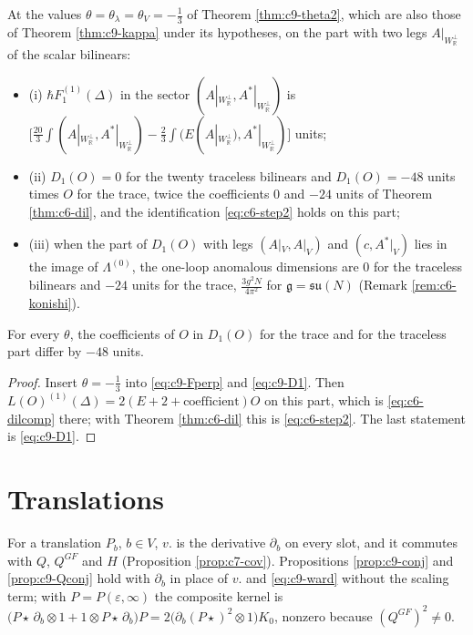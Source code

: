 \begin{corollary}
\label{cor:c9-ident}
At the values $\theta=\theta_\lambda=\theta_V=-\tfrac13$ of Theorem \ref{thm:c9-theta2}, which are also those of Theorem \ref{thm:c9-kappa} under its hypotheses, on the part with two legs $A|_{W_{\mathbb R}^\perp}$ of the scalar bilinears:
\begin{itemize}
\item (i) $\hbar F_1^{(1)}(\Delta)$ in the sector $(A|_{W_{\mathbb R}^\perp},A^*|_{W_{\mathbb R}^\perp})$ is $\big[\tfrac{20}3\int(A|_{W_{\mathbb R}^\perp},A^*|_{W_{\mathbb R}^\perp})-\tfrac23\int(E(A|_{W_{\mathbb R}^\perp}),A^*|_{W_{\mathbb R}^\perp})\big]$ units;
\item (ii) $D_1(O)=0$ for the twenty traceless bilinears and $D_1(O)=-48$ units times $O$ for the trace, twice the coefficients $0$ and $-24$ units of Theorem \ref{thm:c6-dil}, and the identification \eqref{eq:c6-step2} holds on this part;
\item (iii) when the part of $D_1(O)$ with legs $(A|_V,A|_V)$ and $(c,A^*|_V)$ lies in the image of $\Lambda^{(0)}$, the one-loop anomalous dimensions are $0$ for the traceless bilinears and $-24$ units for the trace, $\tfrac{3g^2N}{4\pi^2}$ for $\mathfrak g=\mathfrak{su}(N)$ (Remark \ref{rem:c6-konishi}).
\end{itemize}
For every $\theta$, the coefficients of $O$ in $D_1(O)$ for the trace and for the traceless part differ by $-48$ units.
\end{corollary}

\begin{proof}
Insert $\theta=-\tfrac13$ into \eqref{eq:c9-Fperp} and \eqref{eq:c9-D1}. Then $L(O)^{(1)}(\Delta)=2(E+2+\text{coefficient})O$ on this part, which is \eqref{eq:c6-dilcomp} there; with Theorem \ref{thm:c6-dil} this is \eqref{eq:c6-step2}. The last statement is \eqref{eq:c9-D1}.
\end{proof}

\section{Translations}

For a translation $P_b$, $b\in V$, $v.$ is the derivative $\partial_b$ on every slot, and it commutes with $Q$, $Q^{GF}$ and $H$ (Proposition \ref{prop:c7-cov}). Propositions \ref{prop:c9-conj} and \ref{prop:c9-Qconj} hold with $\partial_b$ in place of $v.$ and \eqref{eq:c9-ward} without the scaling term; with $P=P(\varepsilon,\infty)$ the composite kernel is $\big(P\star\,\partial_b\otimes1+1\otimes P\star\,\partial_b\big)P=2\big(\partial_b(P\star)^2\otimes1\big)K_0$, nonzero because $(Q^{GF})^2\neq0$.

